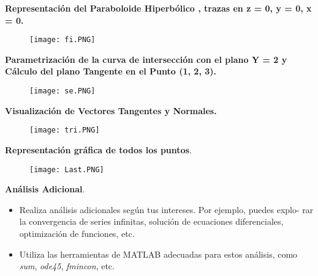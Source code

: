 \documentclass[letterpaper]{article}
\begin{document}
\vspace{\baselineskip}
\newpage
\begin{justify}
    \textbf{Representación del Paraboloide Hiperbólico , trazas en z = 0, y = 0, x = 0. }
\end{justify}

\begin{figure}[H]
    \centering
    \texttt{[image: fi.PNG]}        
\end{figure}

\vspace{\baselineskip}

\begin{justify}
    \textbf{ Parametrización de la curva de intersección con el plano Y = 2 y  Cálculo del plano Tangente en el Punto (1, 2, 3). }
\end{justify}

\begin{figure}[H]
    \centering
    \texttt{[image: se.PNG]}        
\end{figure}

\vspace{\baselineskip}
\newpage
\begin{justify}
    \textbf{Visualización de Vectores Tangentes y Normales.}
\end{justify}

\begin{figure}[H]
    \centering
    \texttt{[image: tri.PNG]}        
\end{figure}

\vspace{\baselineskip}

\begin{justify}
    \textbf{Representación gráfica de todos los puntos}.
\end{justify}

\begin{figure}[H]
    \centering
    \texttt{[image: Last.PNG]}        
\end{figure}

\vspace{\baselineskip}
\newpage
\begin{justify}
    \textbf{ Análisis Adicional}.
\end{justify}
\begin{itemize}
    \item Realiza análisis adicionales según tus intereses. Por ejemplo, puedes explo-
    rar la convergencia de series infinitas, solución de ecuaciones diferenciales,
    optimización de funciones, etc.
    \item Utiliza las herramientas de MATLAB adecuadas para estos análisis, como
    \textit{sum}, \textit{ode45}, \textit{fmincon}, etc.
\end{itemize}
\end{document}

